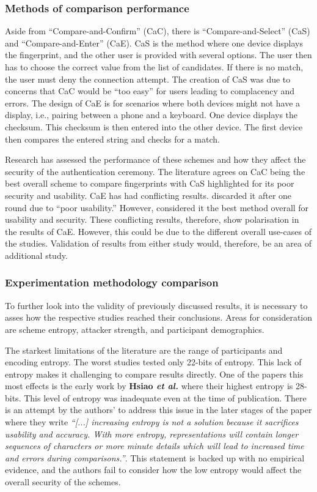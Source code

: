 \subsubsection*{Methods of comparison performance}
Aside 
from ``Compare-and-Confirm'' (CaC), there is ``Compare-and-Select'' (CaS) and ``Compare-and-Enter'' (CaE). CaS is the method where one device displays the fingerprint, and the other user is provided with several options. The user then has to choose the correct value from the list of candidates. If there is no match, the user must deny the connection attempt. The creation of CaS was due to concerns that CaC would be ``too easy'' for users leading to complacency and errors\cite{uzun2007usability}. The design of CaE is for scenarios where both devices might not have a display, i.e., pairing between a phone and a keyboard. One device displays the checksum. This checksum is then entered into the other device. The first device then compares the entered string and checks for a match.

Research has assessed the performance of these schemes and how they affect the security of the authentication ceremony. The literature agrees on CaC being the best overall scheme to compare fingerprints \cite{tan2017can}\cite{uzun2007usability} with CaS highlighted for its poor security and usability. CaE has had conflicting results. \cite{uzun2007usability} discarded it after one round due to ``poor usability.'' However, \cite{tan2017can} considered it the best method overall for usability and security. These conflicting results, therefore, show polarisation in the results of CaE. However, this could be due to the different overall use-cases of the studies. Validation of results from either study would, therefore, be an area of additional study.

\subsubsection*{Experimentation methodology comparison}
To further look into the validity of previously discussed results, it is necessary to asses how the respective studies reached their conclusions. Areas for consideration are scheme entropy, attacker strength, and participant demographics.

The starkest limitations of the literature are the range of participants and encoding entropy. The worst studies tested only 22-bits of entropy. This lack of entropy makes it challenging to compare results directly. One of the papers this most effects is the early work by \textbf{Hsiao \textit{et al.}}\cite{hsiao2009study}  where their highest entropy is 28-bits. This level of entropy was inadequate even at the time of publication. There is an attempt by the authors' to address this issue in the later stages of the paper where they write \textit{``[...] increasing entropy is not a solution because it sacrifices usability and accuracy. With more entropy, representations will contain longer sequences of characters or more minute details which will lead to increased time and errors during comparisons.''}. This statement is backed up with no empirical evidence, and the authors fail to consider how the low entropy would affect the overall security of the schemes.

